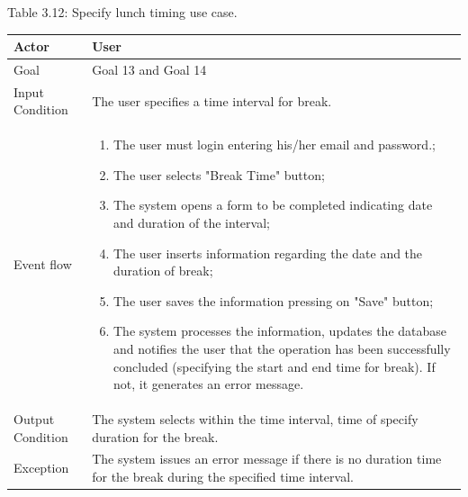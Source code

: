 \documentclass{article}
\begin{document}
	\begin{center}
		Table 3.12: Specify lunch timing use case.
		
		\bigskip
    		\begin{tabular}{p{}|p{}}
   		 	\hline
    			Actor & User \\ \hline
    			Goal & Goal 13 and Goal 14 \\ \hline
    			Input Condition & The user specifies a time interval for break. \\ \hline
    			Event flow & 
			\begin{enumerate}
  				\item The user must login entering his/her email and password.;
  				\item The user selects "Break Time" button;
  				\item The system opens a form to be completed indicating date and duration of the interval;
  				\item The user inserts information regarding the date and the duration of break;
  				\item The user saves the information pressing on "Save" button;
  				\item The system processes the information, updates the database and notifies the user that the operation has been successfully concluded (specifying the start and end time for break). If not, it generates an error message.
 			 \end{enumerate} \\ \hline
    			Output Condition & The system selects within the time interval, time of specify duration for the break. \\ \hline
    			Exception & The system issues an error message if there is no duration time for the break during the specified time interval. \\ \hline
    		\end{tabular}
	\end{center}
	
\end{document}
